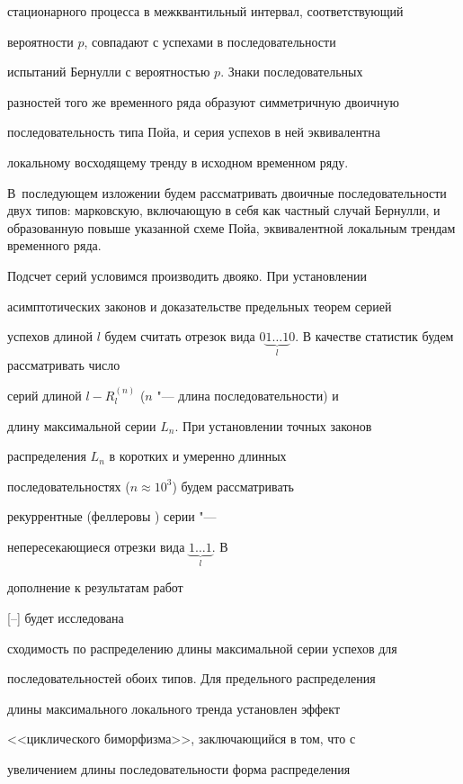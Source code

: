 стационарного процесса в межквантильный интервал, соответствующий

вероятности $p$, совпадают с успехами в последовательности

испытаний Бернулли с вероятностью $p$. Знаки последовательных

разностей того же временного ряда образуют симметричную двоичную

последовательность типа Пойа, и серия успехов в ней эквивалентна

локальному восходящему тренду в исходном временном ряду. 

В~последующем изложении будем рассматривать двоичные последовательности двух типов: марковскую, включающую в себя как частный случай Бернулли, и образованную повыше указанной схеме Пойа, эквивалентной локальным трендам временного ряда.



Подсчет серий условимся производить двояко. При установлении

асимптотических законов и доказательстве предельных теорем серией

успехов длиной $l$ будем считать отрезок вида $0\underbrace

{1\ldots 1}_l0$. В качестве статистик будем рассматривать число

серий длиной $l-R_l^{(n)} $ ($n$ "--- длина последовательности) и

длину максимальной серии $L_n$. При установлении точных законов

распределения $L_n $ в коротких и умеренно длинных

последовательностях ($n\approx 10^3$) будем рассматривать

рекуррентные (феллеровы \cite{barvinok:bib5}) серии "---

непересекающиеся отрезки вида $\underbrace {1\ldots 1}_l$. В

дополнение к результатам работ

[--] будет исследована

сходимость по распределению длины максимальной серии успехов для

последовательностей обоих типов. Для предельного распределения

длины максимального локального тренда установлен эффект

<<циклического биморфизма>>, заключающийся в том, что с

увеличением длины последовательности форма распределения


